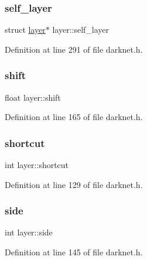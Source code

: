 \mbox{\label{structlayer_a4b265f84aaca806ccaf8607156fbb067}} 
\subsubsection{\texorpdfstring{self\_layer}{self\_layer}}
{\footnotesize\ttfamily struct \mbox{\hyperlink{structlayer}{layer}}$\ast$ layer\+::self\+\_\+layer}



Definition at line 291 of file darknet.\+h.

\mbox{\label{structlayer_a67d23cb25a1d405a4cc63bdea8363f78}} 
\subsubsection{\texorpdfstring{shift}{shift}}
{\footnotesize\ttfamily float layer\+::shift}



Definition at line 165 of file darknet.\+h.

\mbox{\label{structlayer_a84b1f1077ca914dafadb8e82bb12d46d}} 
\subsubsection{\texorpdfstring{shortcut}{shortcut}}
{\footnotesize\ttfamily int layer\+::shortcut}



Definition at line 129 of file darknet.\+h.

\mbox{\label{structlayer_a0286d4acb9afd3c080b0158bf6ef3ca1}} 
\subsubsection{\texorpdfstring{side}{side}}
{\footnotesize\ttfamily int layer\+::side}



Definition at line 145 of file darknet.\+h.

\mbox{\label{structlayer_a4168fc846264723c6149d4e464097a00}} 
